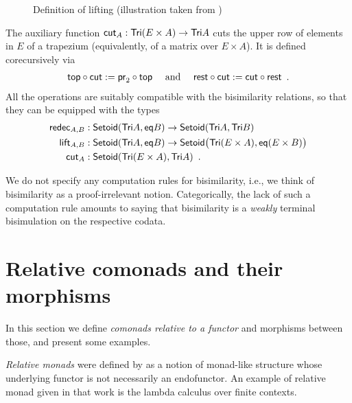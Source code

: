\documentclass[a4paper,USenglish]{lipics}
\begin{document}
\begin{ex}
\begin{figure}[tbp]
\begin{tikzpicture}[scale = 0.6]
  \end{tikzpicture}
  \vspace{-3ex}
  \caption{Definition of lifting (illustration taken from \parencite{DBLP:conf/types/MatthesP11})}
  \label{fig:lift}
\end{figure}
% 
  The auxiliary function $\cut_A : \Tri(E\times A) \to \Tri A$ cuts the upper row of elements in $E$ of a trapezium (equivalently, of a matrix over $E\times A$).
  It is defined corecursively via
% 
  \begin{align*} \comp{\cut}{\head} := \comp{\head}{\pr_2} \quad\text{ and } \quad
                     \comp{\cut}{\tail} := \comp{\tail}{\cut} \enspace . 
      \end{align*}
%       
All the operations are suitably compatible with the bisimilarity relations, so that they can be equipped with the types
  \begin{align*}
    \redec_{A,B} &: \Setoid(\Tri A,\eq B) \to \Setoid(\Tri A,\Tri B ) \\
    \extend_{A,B} &: \Setoid(\Tri A,\eq B) \to \Setoid\bigr(\Tri (E \times A),\eq(E\times B)\bigr) \\
    \cut_A &:  \Setoid(\Tri(E\times A) , \Tri A) \enspace .
  \end{align*}
\end{ex}


\begin{rem}
 We do not specify any computation rules for bisimilarity, i.e., we think of bisimilarity as a proof-irrelevant notion. 
 Categorically, the lack of such a computation rule amounts to saying that bisimilarity is a \emph{weakly} terminal bisimulation on the respective codata. 
\end{rem}


  
\section{Relative comonads and their morphisms}\label{sec:comonads}

In this section we define \emph{comonads relative to a functor} and morphisms between those, and present some examples.

\emph{Relative monads} were defined by \textcite{DBLP:conf/fossacs/AltenkirchCU10} as a notion of monad-like structure
whose underlying functor is not necessarily an endofunctor. 
An example of relative monad given in that work is the lambda calculus over finite contexts.
\end{document}
